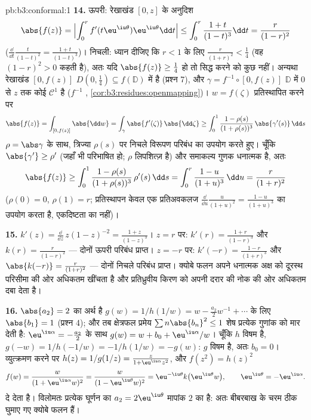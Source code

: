\begin{solution}{pb:b3:conformal:1}
\textbf{14.} ऊपरी: रेखाखंड $[0, z]$ के अनुदिश
\[
\abs{f(z)} = \Bigl|\int_0^rf'(t\eu^{\iu\theta})
\eu^{\iu\theta}\dd t\Bigr|
\leq \int_0^r\frac{1+t}{(1-t)^3}\dd t
= \frac{r}{(1-r)^2}
\]
($\frac{\dd}{\dd t}\frac t{(1-t)^2} = \frac{1+t}{(1-t)^3}$)। निचली: ध्यान दीजिए कि $r < 1$ के लिए $\frac r{(1+r)^2} < \frac14$ (वह $(1-r)^2 > 0$ कहती है),
अतः यदि $\abs{f(z)} \geq \frac14$ हो तो सिद्ध करने को कुछ नहीं। अन्यथा रेखाखंड $[0, f(z)]$
$D(0, \frac14) \subseteq f(\mathbb D)$ में है (प्रश्न 7), और $\gamma = f^{-1}\circ[0, f(z)]$ $\mathbb D$ में $0$ से $z$ तक कोई
$\mathcal C^1$  है ($f^{-1}$ , \cref{cor:b3:residues:openmapping})। $w =
f(\zeta)$ प्रतिस्थापित करने पर
\[
\abs{f(z)} = \int_{[0,f(z)]}\abs{\dd w}
= \int_\gamma\abs{f'(\zeta)}\,\abs{\dd\zeta}
\geq \int_0^1\frac{1 - \rho(s)}{(1 + \rho(s))^3}
\,\abs{\gamma'(s)}\,\dd s
\]
$\rho = \abs\gamma$ के साथ, त्रिज्या $\rho(s)$ पर निचले विरूपण परिबंध का उपयोग करते
हुए। चूँकि $\abs{\gamma'} \geq \rho'$ (जहाँ भी परिभाषित हो; $\rho$ लिपशित्ज़ है) और समाकल्य
गुणक धनात्मक है, अतः
\[
\abs{f(z)} \geq \int_0^1
\frac{1 - \rho(s)}{(1 + \rho(s))^3}\,\rho'(s)\,\dd s
= \int_0^{r}\frac{1 - u}{(1 + u)^3}\,\dd u
= \frac{r}{(1 + r)^2}
\]
($\rho(0) = 0$, $\rho(1) = r$; प्रतिस्थापन केवल एक प्रतिअवकलज $\frac{\dd}{\dd u}\frac u{(1+u)^2} =
\frac{1-u}{(1+u)^3}$ का उपयोग करता
है, एकदिष्टता का नहीं)।

\textbf{15.} $k'(z) = \frac{\dd}{\dd z}\,z(1 - z)^{-2} =
\frac{1 + z}{(1 - z)^3}$। $z = r$ पर: $k'(r) =
\frac{1+r}{(1-r)^3}$ और $k(r) = \frac r{(1-r)^2}$ --- दोनों ऊपरी परिबंध
प्राप्त। $z = -r$ पर: $k'(-r) =
\frac{1-r}{(1+r)^3}$ और $\abs{k(-r)} = \frac r{(1+r)^2}$ --- दोनों निचले परिबंध प्राप्त।
क्योबे फलन अपने धनात्मक अक्ष को दूरस्थ परिसीमा की ओर अधिकतम खींचता
है और प्रतिध्रुवीय किरण को अपनी दरार की नोक की ओर अधिकतम दबा देता
है।

\textbf{16.} $\abs{a_2} = 2$ का अर्थ है $g(w)
= 1/h(1/w) = w - \frac{a_2}2w^{-1} + \cdots$ के लिए $\abs{b_1} = 1$ (प्रश्न 4); और तब
क्षेत्रफल प्रमेय $\sum n\abs{b_n}^2 \leq 1$ शेष प्रत्येक गुणांक को मार देती है: $\eu^{\iu\alpha} = -\frac{a_2}2$ के
साथ $g(w) = w + b_0 + \eu^{\iu\alpha}/w$। चूँकि $h$ विषम है, $g(-w) =
1/h(-1/w) = -1/h(1/w) = -g(w)$: $g$ विषम है, अतः $b_0 = 0$।
व्युत्क्रमण करने पर $h(z) = 1/g(1/z) = \frac{z}{1 +
\eu^{\iu\alpha}z^2}$, और $f(z^2) = h(z)^2$
\[
f(w) = \frac{w}{(1 + \eu^{\iu\alpha}w)^2}
= \frac{w}{(1 - \eu^{\iu\theta}w)^2}
= \eu^{-\iu\theta}k\bigl(\eu^{\iu\theta}w\bigr),
\qquad \eu^{\iu\theta} = -\eu^{\iu\alpha} .
\]
दे देता है। विलोमतः प्रत्येक घूर्णन का $a_2 = 2\eu^{\iu\theta}$ मापांक $2$ का है: अतः
बीबरबाख के चरम ठीक घुमाए गए क्योबे फलन हैं।


\end{solution}
